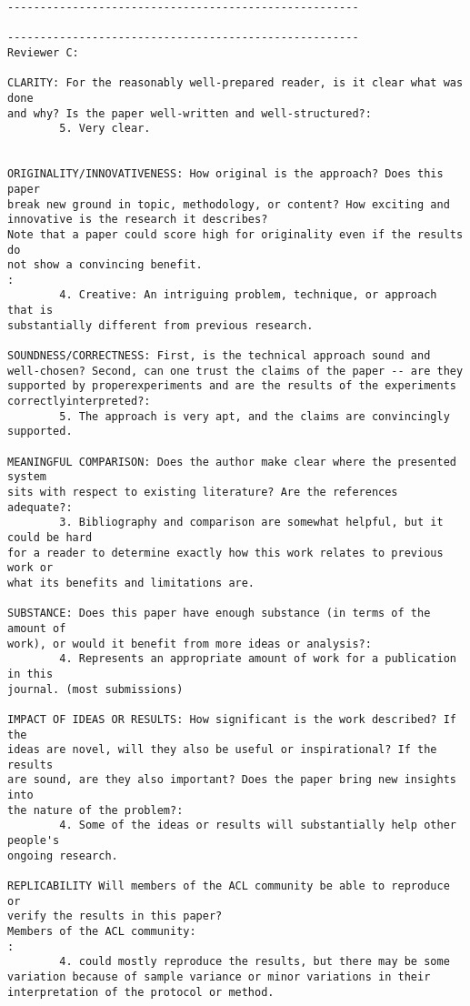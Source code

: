 \documentclass{article}[11pt,oneside]
\begin{document}
\begin{verbatim}
------------------------------------------------------

------------------------------------------------------
Reviewer C:

CLARITY: For the reasonably well-prepared reader, is it clear what was done
and why? Is the paper well-written and well-structured?:
        5. Very clear.


ORIGINALITY/INNOVATIVENESS: How original is the approach? Does this paper
break new ground in topic, methodology, or content? How exciting and
innovative is the research it describes?
Note that a paper could score high for originality even if the results do
not show a convincing benefit.
:
        4. Creative: An intriguing problem, technique, or approach that is
substantially different from previous research.

SOUNDNESS/CORRECTNESS: First, is the technical approach sound and
well-chosen? Second, can one trust the claims of the paper -- are they
supported by properexperiments and are the results of the experiments
correctlyinterpreted?:
        5. The approach is very apt, and the claims are convincingly supported.

MEANINGFUL COMPARISON: Does the author make clear where the presented system
sits with respect to existing literature? Are the references adequate?:
        3. Bibliography and comparison are somewhat helpful, but it could be hard
for a reader to determine exactly how this work relates to previous work or
what its benefits and limitations are.

SUBSTANCE: Does this paper have enough substance (in terms of the amount of
work), or would it benefit from more ideas or analysis?:
        4. Represents an appropriate amount of work for a publication in this
journal. (most submissions)

IMPACT OF IDEAS OR RESULTS: How significant is the work described? If the
ideas are novel, will they also be useful or inspirational? If the results
are sound, are they also important? Does the paper bring new insights into
the nature of the problem?:
        4. Some of the ideas or results will substantially help other people's
ongoing research.

REPLICABILITY Will members of the ACL community be able to reproduce or
verify the results in this paper?
Members of the ACL community:
:
        4. could mostly reproduce the results, but there may be some
variation because of sample variance or minor variations in their
interpretation of the protocol or method.


\end{verbatim}
\end{document}
